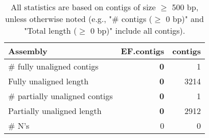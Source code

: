 \documentclass[12pt,a4paper]{article}
\begin{document}
\begin{table}[ht]
\begin{center}
\caption{All statistics are based on contigs of size $\geq$ 500 bp, unless otherwise noted (e.g., "\# contigs ($\geq$ 0 bp)" and "Total length ($\geq$ 0 bp)" include all contigs).}
\begin{tabular}{|l*{2}{|r}|}
\hline
Assembly & EF.contigs & contigs \\ \hline
\# fully unaligned contigs & {\bf 0} & 1 \\ \hline
Fully unaligned length & {\bf 0} & 3214 \\ \hline
\# partially unaligned contigs & {\bf 0} & 1 \\ \hline
Partially unaligned length & {\bf 0} & 2912 \\ \hline
\# N's & 0 & 0 \\ \hline
\end{tabular}
\end{center}
\end{table}
\end{document}
